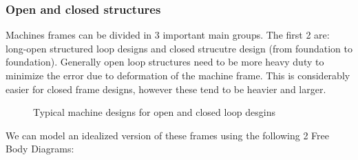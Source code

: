 \documentclass[11pt, a4paper]{article}
\numberwithin{equation}{section}
\numberwithin{figure}{section}
\begin{document}
\subsubsection{Open and closed structures}
Machines frames can be divided in 3 important main groups. The first 2 are: long-open structured loop designs and closed strucutre design (from foundation to foundation). Generally open loop structures need to be more heavy duty to minimize the error due to deformation of the machine frame. This is considerably easier for closed frame designs, however these tend to be heavier and larger.
\begin{figure}[h]
  \centering
  \qquad
  \caption{Typical machine designs for open and closed loop desgins}
\end{figure}
We can model an idealized version of these frames using the following 2 Free Body Diagrams:
\end{document}
